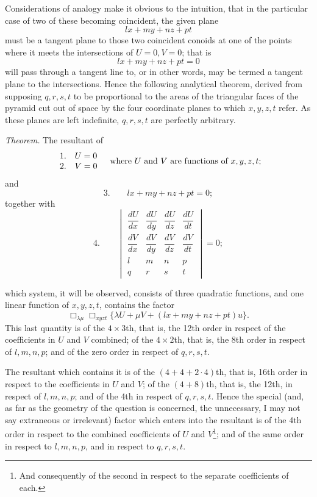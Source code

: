 \documentclass[11pt]{article}
\newcommand{\sourcepage}[1]{\marginpar{\scriptsize p.~#1}}
\begin{document}
{{Considerations of analogy make it obvious to the intuition, that in the particular case of two of these becoming coincident, the given plane
\[
lx+my+nz+pt
\]
must be a tangent plane to those two coincident conoids at one of the points where it meets the intersections of $U=0,V=0$; that is
\[
lx+my+nz+pt=0
\]
will pass through a tangent line to, or in other words, may be termed a tangent plane to the intersections. Hence the following analytical theorem, derived from supposing $q,r,s,t$ to be proportional to the areas of the triangular faces of the pyramid cut out of space by the four coordinate planes to which $x,y,z,t$ refer. As these planes are left indefinite, $q,r,s,t$ are perfectly arbitrary.

\emph{Theorem.} The resultant of
\[
\begin{array}{ll}
1.&U=0\\
2.&V=0
\end{array}
\quad \hbox{where $U$ and $V$ are functions of $x,y,z,t$;}
\]
and
\[
3.\qquad lx+my+nz+pt=0;
\]
together with
\[
4.\qquad
\begin{vmatrix}
\dfrac{dU}{dx}&\dfrac{dU}{dy}&\dfrac{dU}{dz}&\dfrac{dU}{dt}\\[0.6em]
\dfrac{dV}{dx}&\dfrac{dV}{dy}&\dfrac{dV}{dz}&\dfrac{dV}{dt}\\[0.6em]
l&m&n&p\\
q&r&s&t
\end{vmatrix}=0;
\]

\sourcepage{143}
which system, it will be observed, consists of three quadratic functions, and one linear function of $x,y,z,t$, contains the factor
\[
\Box_{\lambda\mu}\Box_{xyzt}\{\lambda U+\mu V+(lx+my+nz+pt)u\}.
\]
This last quantity is of the $4\times3$th, that is, the 12th order in respect of the coefficients in $U$ and $V$ combined; of the $4\times2$th, that is, the 8th order in respect of $l,m,n,p$; and of the zero order in respect of $q,r,s,t$.

The resultant which contains it is of the $(4+4+2\cdot4)$th, that is, 16th order in respect to the coefficients in $U$ and $V$; of the $(4+8)$th, that is, the 12th, in respect of $l,m,n,p$; and of the 4th in respect of $q,r,s,t$. Hence the special (and, as far as the geometry of the question is concerned, the unnecessary, I may not say extraneous or irrelevant) factor which enters into the resultant is of the 4th order in respect to the combined coefficients of $U$ and $V$\footnote{And consequently of the second in respect to the separate coefficients of each.}; and of the same order in respect to $l,m,n,p$, and in respect to $q,r,s,t$.

}}
\end{document}
